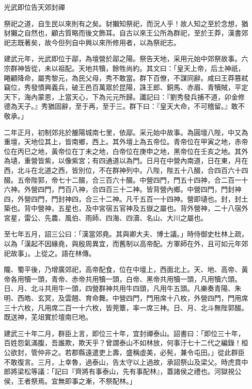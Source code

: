 
\begin{pinyinscope}
光武即位告天郊封禪

祭祀之道，自生民以來則有之矣。豺獺知祭祀，而況人乎！故人知之至於念想，猶豺獺之自然也，顧古質略而後文飾耳。自古以來王公所為群祀，至於王莽，漢書郊祀志既著矣，故今但列自中興以來所修用者，以為祭祀志。

建武元年，光武即位于鄗，為壇營於鄗之陽。祭告天地，采用元始中郊祭故事。六宗群神皆從，未以祖配。天地共犢，餘牲尚約。其文曰：「皇天上帝，后土神祇，睠顧降命，屬秀黎元，為民父母，秀不敢當。群下百僚，不謀同辭。咸曰王莽篡弒竊位，秀發憤興義兵，破王邑百萬眾於昆陽，誅王郎、銅馬、赤眉、青犢賊，平定天下，海內蒙恩，上當天心，下為元元所歸。讖記曰：『劉秀發兵捕不道，卯金修德為天子。』秀猶固辭，至于再，至于三。群下曰：『皇天大命，不可稽留。』敢不敬承。」

二年正月，初制郊兆於雒陽城南七里，依鄗。采元始中故事。為圓壇八陛，中又為重壇，天地位其上，皆南鄉，西上。其外壇上為五帝位。青帝位在甲寅之地，赤帝位在丙巳之地，黃帝位在丁未之地，白帝位在庚申之地，黑帝位在壬亥之地。其外為壝，重營皆紫，以像紫宮；有四通道以為門。日月在中營內南道，日在東，月在西，北斗在北道之西，皆別位，不在群神列中。八陛，陛五十八醊，合四百六十四醊。五帝陛郭，帝七十二醊，合三百六十醊。中營四門，門五十四神，合二百一十六神。外營四門，門百八神，合四百三十二神。皆背營內鄉。中營四門，門封神四，外營四門，門封神四，合三十二神。凡千五百一十四神。營即壝也。封，封土築也。背中營神，五星也，及中宮宿五官神及五嶽之屬也。背外營神，二十八宿外宮星，雷公、先農、風伯、雨師、四海、四瀆、名山、大川之屬也。

至七年五月，詔三公曰：「漢當郊堯。其與卿大夫、博士議。」時侍御史杜林上疏，以為「漢起不因緣堯，與殷周異宜，而舊制以高帝配。方軍師在外，且可如元年郊祀故事」。上從之。語在林傳。

隴、蜀平後，乃增廣郊祀，高帝配食，位在中壇上，西面北上。天、地、高帝、黃帝各用犢一頭，青帝、赤帝共用犢一頭，白帝、黑帝共用犢一頭，凡用犢六頭。日、月、北斗共用牛一頭，四營群神共用牛四頭，凡用牛五頭。凡樂奏青陽、朱明、西皓、玄冥，及雲翹、育命舞。中營四門，門用席十八枚，外營四門，門用席三十六枚，凡用席二百一十六枚，皆莞簟，率一席三神。日、月、北斗無陛郭醊。既送神，芜俎實於壇南巳地。

建武三十年二月，群臣上言，即位三十年，宜封禪泰山。詔書曰：「即位三十年，百姓怨氣滿腹，吾誰欺，欺天乎？曾謂泰山不如林放，何事汙七十二代之編錄！桓公欲封，管仲非之。若郡縣遠遣吏上壽，盛稱虛美，必髡，兼令屯田。」從此群臣不敢復言。三月，上幸魯，過泰山，告太守以上過故，承詔祭山及梁父。時虎賁中郎將梁松等議：「記曰『齊將有事泰山，先有事配林』，蓋諸侯之禮也。河獄視公侯，王者祭焉。宜無即事之漸，不祭配林。」


\end{pinyinscope}
